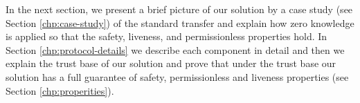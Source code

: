 \documentclass[pageno]{jpaper}
\begin{document}
\smallskip In the next section, we present a brief picture of our solution by a case study (see Section \ref{chp:case-study}) of the standard transfer and explain how zero knowledge is applied so that the safety, liveness, and permissionless properties hold. In Section \ref{chp:protocol-details} we describe each component in detail and then we explain the trust base of our solution and prove that under the trust base our solution has a full guarantee of safety, permissionless and liveness properties (see Section \ref{chp:properities}).










\end{document}
